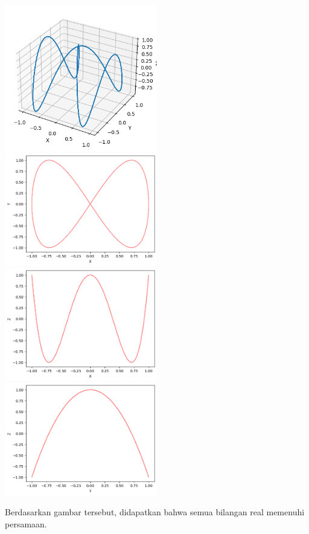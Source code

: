 \documentclass[twoside]{scrarticle}
\begin{document}
\begin{enumerate}
		\begin{minipage}{\linewidth}
			\includegraphics[width=0.5\textwidth]{36.png}
			\includegraphics[width=0.5\textwidth]{36_xy.png}
			\includegraphics[width=0.5\textwidth]{36_xz.png}
			\includegraphics[width=0.5\textwidth]{36_yz.png}
		\end{minipage}
		
		Berdasarkan gambar tersebut, didapatkan bahwa semua bilangan real memenuhi persamaan. 
		

\end{enumerate}
\end{document}
